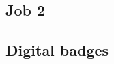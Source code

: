 \documentclass[a4paper,9pt]{article}
\begin{document}
\begin{tcolorbox}
\vspace{-3.2mm}
\subsection*{Job 2}
\vspace{-1.2mm}
\lipsum[1]
\vspace{-2.2mm}

{\color{blue}\subsection*{Digital badges}}
\vspace{-3.2mm}

\end{tcolorbox}


\vspace{-1.0mm}
\par\medskip
\end{document}
